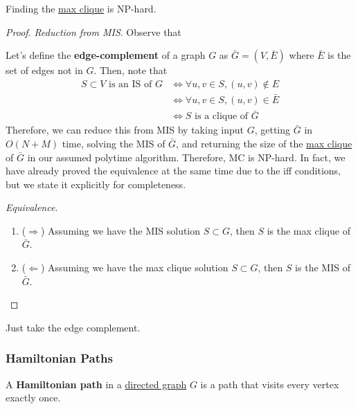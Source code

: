     \begin{theorem}[MC]
      \label{thm:mc}
      Finding the \hyperref[def:max-clique]{max clique} is NP-hard. 
    \end{theorem}
    \begin{proof}
      \textit{Reduction from MIS}. Observe that 

      Let's define the \textbf{edge-complement} of a graph $G$ as $\bar{G} = (V, \bar{E})$ where $\bar{E}$ is the set of edges not in $G$. Then, note that 
      \begin{align}
        S \subset V \text{ is an IS of } G & \iff \forall u, v \in S, (u, v) \not\in E  \\
                                           & \iff \forall u, v \in S, (u, v) \in \bar{E} \\
                                           & \iff S \text{ is a clique of } \bar{G} 
      \end{align}
      Therefore, we can reduce this from MIS by taking input $G$, getting $\bar{G}$ in $O(N + M)$ time, solving the MIS of $\bar{G}$, and returning the size of the \hyperref[def:max-clique]{max clique} of $\bar{G}$ in our assumed polytime algorithm. Therefore, MC is NP-hard. In fact, we have already proved the equivalence at the same time due to the iff conditions, but we state it explicitly for completeness. 

      \textit{Equivalence}. 
      \begin{enumerate}
        \item ($\Rightarrow$) Assuming we have the MIS solution $S \subset G$, then $S$ is the max clique of $\bar{G}$. 
        \item ($\Leftarrow$) Assuming we have the max clique solution $S \subset G$, then $S$ is the MIS of $\bar{G}$. 
      \end{enumerate}
    \end{proof}

    \begin{example}
      \label{ex:reduction-of-independent-set-to-clique}
      Just take the edge complement. 
    \end{example}

  \subsubsection{Hamiltonian Paths} 

    \begin{definition}
      \label{def:hamiltonian-path}
      A \textbf{Hamiltonian path} in a \hyperref[def:directed-graph]{directed graph} $G$ is a path that visits every vertex exactly once. 
    \end{definition} 

